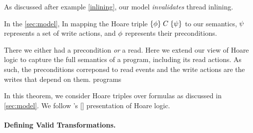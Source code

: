 As discussed after example \eqref{inlining}, our model {\em invalidates}
thread inlining.


In the \textsection\ref{sec:model}, 
In mapping the Hoare triple $\{\phi\}\allowbreak\;C\;\allowbreak\{\psi\}$ to our semantics,
$\psi$ represents a set of write actions, and $\phi$ represents their
preconditions.

There we either had a precondition \emph{or} a read.  Here we extend our view
of Hoare logic to capture the full semantics of a program, including its read
actions.  As such, the preconditions correponsd to read events and the write
actions are the writes that depend on them.
programs 

In this theorem, we consider Hoare triples over formulas as discussed in
\textsection\ref{sec:model}.  
We follow \citeauthor{gordonHoare}'s
[\citeyear{gordonHoare}] presentation of Hoare logic.

\paragraph*{Defining Valid Transformations.}





